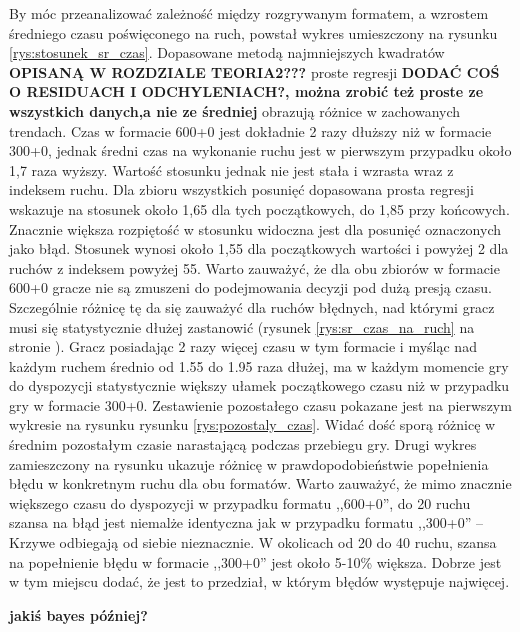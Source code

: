 \documentclass[inzynierska]{pwr_wmat_praca_dyplomowa}
\theoremstyle{plain}
\numberwithin{theorem}{chapter}
\theoremstyle{definition}
\numberwithin{theorem}{chapter}
\begin{document}
By móc przeanalizować zależność między rozgrywanym formatem, a wzrostem średniego czasu poświęconego na ruch, powstał wykres umieszczony na rysunku \ref{rys:stosunek_sr_czas}. Dopasowane metodą najmniejszych kwadratów \textbf{OPISANĄ W ROZDZIALE TEORIA2???} proste regresji \textbf{DODAĆ COŚ O RESIDUACH I ODCHYLENIACH?, można zrobić też proste ze wszystkich danych,a nie ze średniej} obrazują różnice w zachowanych trendach. Czas w formacie 600+0 jest dokładnie 2 razy dłuższy niż w formacie 300+0, jednak średni czas na wykonanie ruchu jest w pierwszym przypadku około 1,7 raza wyższy. Wartość stosunku jednak nie jest stała i wzrasta wraz z indeksem ruchu. Dla zbioru wszystkich posunięć dopasowana prosta regresji wskazuje na stosunek około 1,65 dla tych początkowych, do 1,85 przy końcowych. Znacznie większa rozpiętość w stosunku widoczna jest dla posunięć oznaczonych jako błąd. Stosunek wynosi około 1,55 dla początkowych wartości i powyżej 2 dla ruchów z indeksem powyżej 55. Warto zauważyć, że dla obu zbiorów w formacie 600+0 gracze nie są zmuszeni do podejmowania decyzji pod dużą presją czasu. Szczególnie różnicę tę da się zauważyć dla ruchów błędnych, nad którymi gracz musi się statystycznie dłużej zastanowić (rysunek \ref{rys:sr_czas_na_ruch} na stronie \pageref{rys:sr_czas_na_ruch}). Gracz posiadając 2 razy więcej czasu w tym formacie i myśląc nad każdym ruchem średnio od 1.55 do 1.95 raza dłużej,  ma w każdym momencie gry do dyspozycji statystycznie większy ułamek początkowego czasu niż w przypadku gry w formacie 300+0. Zestawienie pozostałego czasu pokazane jest na pierwszym wykresie na rysunku rysunku \ref{rys:pozostaly_czas}. Widać dość sporą różnicę w średnim pozostałym czasie narastającą podczas przebiegu gry. Drugi wykres zamieszczony na rysunku ukazuje różnicę w prawdopodobieństwie popełnienia błędu w konkretnym ruchu dla obu formatów. Warto zauważyć, że mimo znacznie większego czasu do dyspozycji w przypadku formatu ,,600+0'', do 20 ruchu szansa na błąd jest niemalże identyczna jak w przypadku formatu ,,300+0'' -- Krzywe odbiegają od siebie nieznacznie. W okolicach od 20 do 40 ruchu, szansa na popełnienie błędu w formacie ,,300+0'' jest około 5-10\% większa. Dobrze jest w tym miejscu dodać, że jest to przedział, w którym błędów występuje najwięcej.

\textbf{jakiś bayes później? }
\end{document}
